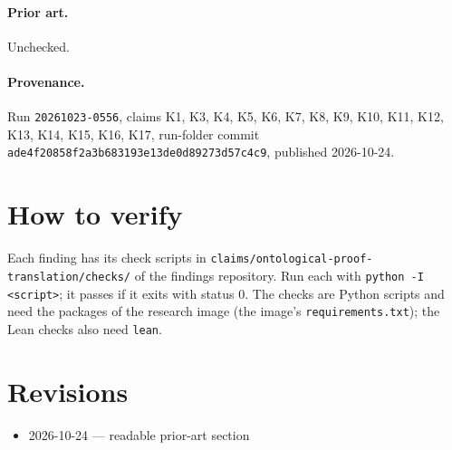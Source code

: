 \documentclass{article}
\begin{document}
\paragraph{Prior art.} Unchecked.

\paragraph{Provenance.}
Run \texttt{20261023-0556}, claims K1, K3, K4, K5, K6, K7, K8, K9, K10, K11, K12, K13, K14, K15, K16, K17, run-folder commit \texttt{ade4f20858f2a3b683193e13de0d89273d57c4c9}, published 2026-10-24.

\section{How to verify}

Each finding has its check scripts in \texttt{claims/ontological-proof-translation/checks/} of the findings repository. Run each with \texttt{python -I <script>}; it passes if it exits with status 0. The checks are Python scripts and need the packages of the research image (the image's \texttt{requirements.txt}); the Lean checks also need \texttt{lean}.

\section{Revisions}

\begin{itemize}
\item 2026-10-24 --- readable prior-art section
\end{itemize}



\end{document}
